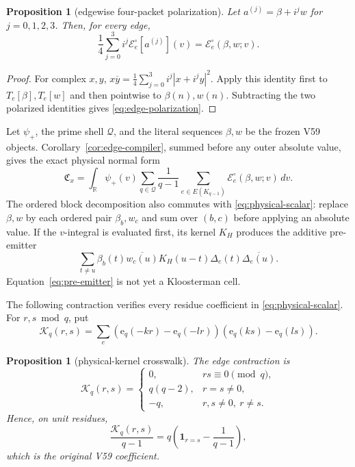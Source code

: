 \documentclass[11pt]{article}
\newtheorem{proposition}[theorem]{Proposition}
\newcommand{\e}{\mathrm e}
\newcommand{\cQ}{\mathcal Q}
\newcommand{\cE}{\mathcal E}
\newcommand{\cK}{\mathcal K}
\begin{document}
\begin{proposition}[edgewise four-packet polarization]
\label{prop:polarization}
Let $a^{(j)}=\beta+i^jw$ for $j=0,1,2,3$.  Then, for every edge,
\begin{equation}\label{eq:edge-polarization}
 \boxed{
 \frac14\sum_{j=0}^3i^j\cE_e^\circ[a^{(j)}](v)
 =\cE_e^\circ(\beta,w;v).}
\end{equation}
\end{proposition}

\begin{proof}
For complex $x,y$,
$x\overline y=\frac14\sum_{j=0}^3i^j|x+i^jy|^2$.
Apply this identity first to $T_e[\beta],T_e[w]$ and then pointwise to
$\beta(n),w(n)$.  Subtracting the two polarized identities gives
\eqref{eq:edge-polarization}.
\end{proof}

Let $\psi_+$, the prime shell $\cQ$, and the literal sequences $\beta,w$ be
the frozen V59 objects.  Corollary~\ref{cor:edge-compiler}, summed before any
outer absolute value, gives the exact physical normal form
\begin{equation}\label{eq:physical-scalar}
 \boxed{
 \mathfrak C_x=
 \int_{\mathbb R}\psi_+(v)
 \sum_{q\in\cQ}\frac1{q-1}
 \sum_{e\in E(K_{q-1})}\cE_e^\circ(\beta,w;v)\,dv.}
\end{equation}
The ordered block decomposition also commutes with
\eqref{eq:physical-scalar}: replace $\beta,w$ by each ordered pair
$\beta_b,w_c$ and sum over $(b,c)$ before applying an absolute value.  If the
$v$-integral is evaluated first, its kernel $K_H$ produces the additive
pre-emitter
\begin{equation}\label{eq:pre-emitter}
 \sum_{t\ne u}\beta_b(t)\overline{w_c(u)}K_H(u-t)
 \Delta_e(t)\overline{\Delta_e(u)}.
\end{equation}
Equation~\eqref{eq:pre-emitter} is not yet a Kloosterman cell.

The following contraction verifies every residue coefficient in
\eqref{eq:physical-scalar}.  For $r,s\bmod q$, put
\begin{equation}\label{eq:physical-kernel-definition}
 \cK_q(r,s)=\sum_e
 (\e_q(-kr)-\e_q(-lr))(\e_q(ks)-\e_q(ls)).
\end{equation}

\begin{proposition}[physical-kernel crosswalk]\label{prop:physical-kernel}
The edge contraction is
\begin{equation}\label{eq:physical-kernel}
 \boxed{
 \cK_q(r,s)=
 \begin{cases}
 0,&rs\equiv0\pmod q,\\
 q(q-2),&r=s\ne0,\\
 -q,&r,s\ne0,\ r\ne s.
 \end{cases}}
\end{equation}
Hence, on unit residues,
\begin{equation}\label{eq:literal-crosswalk}
 \frac{\cK_q(r,s)}{q-1}
 =q\left(\mathbf1_{r=s}-\frac1{q-1}\right),
\end{equation}
which is the original V59 coefficient.
\end{proposition}
\end{document}
